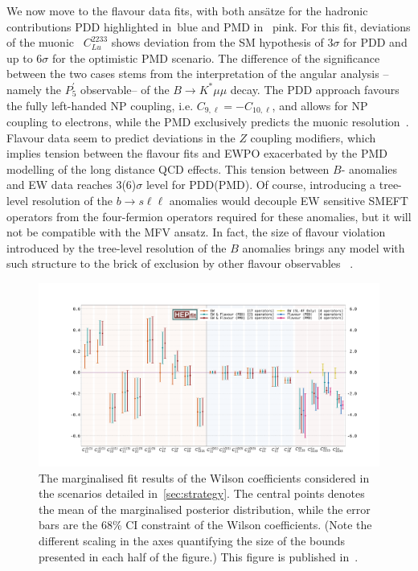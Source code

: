 We now move to the flavour data fits, with both ans\"atze for the hadronic contributions PDD highlighted in~\textcolor[HTML]{0843a5}{blue} and PMD in~ \textcolor[HTML]{c00054}{pink}. For this fit, deviations of the muonic ~$C_{Lu}^{22 33}$ shows deviation from the SM hypothesis of $3\sigma$ for PDD and up to $6\sigma$ for the optimistic PMD scenario. The difference of the significance between the two cases stems from the interpretation of the angular analysis --namely the $P^\prime_5$ observable-- of the $B \to K^{*} \mu \mu$ decay. The PDD approach favours the fully left-handed NP coupling, i.e.  $C_{9, \ell} = - C_{10, \ell}$, and allows for NP coupling to electrons, while the PMD exclusively predicts the muonic resolution~\cite{Ciuchini:2017mik,Ciuchini:2019usw}.\\ Flavour data seem to predict deviations in the $Z$ coupling modifiers, which implies tension between the flavour fits and EWPO exacerbated by the PMD modelling of the long distance QCD effects.  This tension between $B$- anomalies and EW data reaches  3(6)$\sigma$ level for PDD(PMD). Of course, introducing a tree-level resolution of the $b \to s \ell \ell$ anomalies would decouple EW sensitive SMEFT operators from the four-fermion operators required for these anomalies, but it will not be compatible with the MFV ansatz. In fact, the size of flavour violation introduced by the tree-level resolution of the $B$ anomalies brings any model with such structure to the brick of exclusion by other flavour observables ~\cite{Bona:2007vi,Silvestrini:2018dos,Greljo:2017vvb,Baker:2019sli}.
\\
\begin{figure}
	\centering
	\includegraphics[width=\textwidth]{figures/errorbar.pdf}
	\caption{
		The marginalised fit results of the Wilson coefficients considered in the scenarios detailed in~\autoref{sec:strategy}. The central points denotes the mean of the marginalised posterior distribution, while the error bars are the 68\% CI constraint of the Wilson coefficients.  (Note the different scaling in the axes quantifying the size of the bounds presented in each half of the figure.) This figure is published in~\cite{Alasfar:2020mne}. 
	}
	\label{fig:ew_flav_bounds}
\end{figure}
